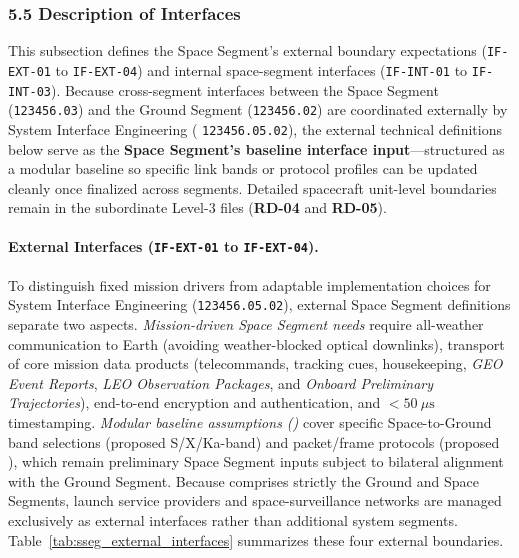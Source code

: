 \subsubsection{5.5 Description of Interfaces}

This subsection defines the Space Segment's external boundary expectations (\texttt{IF-EXT-01} to \texttt{IF-EXT-04}) and internal space-segment interfaces (\texttt{IF-INT-01} to \texttt{IF-INT-03}). Because cross-segment interfaces between the Space Segment (\texttt{123456.03}) and the Ground Segment (\texttt{123456.02}) are coordinated externally by System Interface Engineering ( \texttt{123456.05.02}), the external technical definitions below serve as the \textbf{Space Segment's baseline interface input}---structured as a modular baseline so specific link bands or protocol profiles can be updated cleanly once finalized across segments. Detailed spacecraft unit-level boundaries remain in the subordinate Level-3 files (\textbf{RD-04} and \textbf{RD-05}).

\paragraph{External Interfaces (\texttt{IF-EXT-01} to \texttt{IF-EXT-04}).}
To distinguish fixed mission drivers from adaptable implementation choices for System Interface Engineering (\texttt{123456.05.02}), external Space Segment definitions separate two aspects. \emph{Mission-driven Space Segment needs} require all-weather  communication to Earth (avoiding weather-blocked optical downlinks), transport of core mission data products (telecommands, tracking cues, housekeeping, \emph{GEO Event Reports}, \emph{LEO Observation Packages}, and \emph{Onboard Preliminary Trajectories}), end-to-end encryption and authentication, and $< 50~\mu\mathrm{s}$  timestamping. \emph{Modular baseline assumptions ()} cover specific Space-to-Ground  band selections (proposed S/X/Ka-band) and packet/frame protocols (proposed ), which remain preliminary Space Segment inputs subject to bilateral alignment with the Ground Segment. Because  comprises strictly the Ground and Space Segments, launch service providers and space-surveillance networks are managed exclusively as external interfaces rather than additional system segments. Table~\ref{tab:sseg_external_interfaces} summarizes these four external boundaries.

